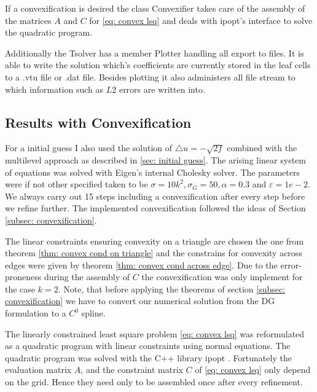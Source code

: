 If a convexification is desired the class Convexifier takes care of the assembly of the matrices $A$ and $C$ for \eqref{eq: convex lsq} and deals with ipopt's interface to solve the quadratic program.

Additionally the Tsolver has a member Plotter handling all export to files. It is able to write the solution which's coefficients are currently stored in the leaf cells to a .vtu file or .dat file. Besides plotting it also administers all file stream to which information such as $L2$ errors are written into.

\subsection{Results with Convexification}

For a initial guess I also used the solution of $\triangle u = -\sqrt{2f}$ combined with the multilevel approach as described in \ref{sec: initial guess}.
The arising linear system of equations was solved with Eigen's internal Cholesky solver.
The parameters were if not other specified taken to be $\sigma=10 k^2, \sigma_G = 50, \alpha =
0.3$ and $\varepsilon = 1e-2$. We always carry out 15 steps including a convexification after every step before we refine further. The implemented convexification followed the ideas of Section \ref{subsec: convexification}. 

The linear constraints ensuring convexity on a triangle are chosen the one from theorem \ref{thm: convex cond on triangle} and the constrains for convexity across edges were given by theorem \ref{thm: convex cond across edge}. Due to the error-proneness during the assembly of $C$ the convexification was only implement for the case $k=2$. Note, that before applying the theorems of section \ref{subsec: convexification} we have to convert our numerical solution from the DG formulation to a $C^0$ spline.

The linearly constrained least square problem \eqref{eq: convex lsq}  was reformulated as a quadratic program with linear constraints using normal equations. 
The quadratic program was solved with the C++ library ipopt \cite{ipopt}. Fortunately the evaluation matrix $A$, and the constraint matrix $C$ of \eqref{eq: convex lsq} only depend on the grid. Hence they need only to be assembled once after every refinement.


